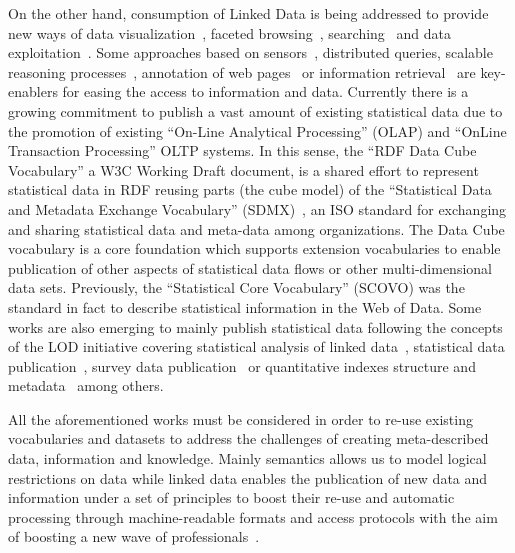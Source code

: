 On the other hand, consumption of Linked Data is being addressed to provide new ways of data 
visualization~\cite{DBLP:journals/semweb/DadzieR11}, faceted browsing~\cite{citeulike:8529753}, 
searching~\cite{hoga-etal-2011-swse-JWS} and data exploitation~\cite{Harth:2011:SIP:1963192.1963318}. Some approaches 
based on sensors~\cite{Jeung:2010:EMM:1850003.1850235}, distributed queries\cite{Hartig09executingsparql}, 
scalable reasoning processes~\cite{DBLP:journals/ws/UrbaniKMHB12}, annotation of web pages~\cite{rdfa-primer} or information retrieval~\cite{Pound} are key-enablers for easing the access 
to information and data. Currently there is a growing commitment to publish a vast amount of existing statistical data due to 
the promotion of existing ``On-Line Analytical Processing'' (OLAP) and ``OnLine Transaction Processing'' OLTP systems. 
In this sense, the ``RDF Data Cube Vocabulary'' a W3C Working Draft document, is a shared effort to 
represent statistical data in RDF reusing parts (the cube model) of the ``Statistical Data and Metadata Exchange Vocabulary'' (SDMX)~\cite{sdmx}, an ISO standard 
for exchanging and sharing statistical data and meta-data among organizations. The Data Cube vocabulary is a core 
foundation which supports extension vocabularies to enable publication of other aspects of statistical data flows or 
other multi-dimensional data sets. Previously, the ``Statistical Core Vocabulary'' (SCOVO) was the standard in 
fact to describe statistical information in the Web of Data. Some works are also emerging to mainly publish statistical data 
following the concepts of the LOD initiative covering statistical analysis of linked data~\cite{DBLP:conf/semweb/ZapilkoM11}, 
statistical data publication~\cite{DBLP:journals/ijsc/SalasMBCMA12}, survey data publication~\cite{DDI2013,DBLP:conf/dgo/FernandezMG11} or 
quantitative indexes structure and metadata~\cite{webindexlod} among others.

All the aforementioned works must be considered in order to re-use existing vocabularies and datasets to address 
the challenges of creating meta-described data, information and knowledge. Mainly semantics allows us to model logical restrictions 
on data while linked data enables the publication of new data and information under a set of principles 
to boost their re-use and automatic processing through machine-readable formats and access protocols with the aim of boosting 
a new wave of professionals~\cite{DBLP:journals/ijhcitp/PalaciosSAG12}.


